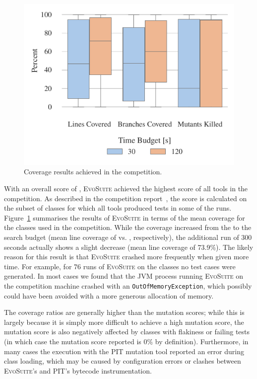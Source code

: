 \documentclass[10pt,conference]{IEEEtran}
\newcommand{\EVOSUITE}{\textsc{EvoSuite}\xspace}
\begin{document}
\begin{figure}
	\centering
	\includegraphics[width=\columnwidth]{data/CoverageBoxV}
	\vspace{-2em}
	\caption{\label{fig:results}Coverage results achieved in the competition.}
	\vspace{-1em}
\end{figure}


With an overall score of \score, \EVOSUITE achieved the highest score of all
tools in the competition. As described in the competition
report~\cite{SBST-toolcomp22}, the score is calculated on the subset of \cuts classes
for which all tools produced tests in some of the runs.
Figure~\ref{fig:results} summarises the results of \EVOSUITE in terms of the
mean coverage for the \cuts classes used in the competition. While the coverage
increased from the \budgetShort to the \budgetLong search budget (mean line
coverage of \avgLinesCoverageRatioShort vs. \avgLinesCoverageRatioLong, respectively),
the additional run of 300 seconds
actually shows a slight decrease (mean line coverage of 73.9\%). The likely
reason for this result is that \EVOSUITE crashed more frequently when given
more time. For example, for 76 runs of \EVOSUITE on the \cuts classes no test
cases were generated. In most cases we found that the JVM process running
\EVOSUITE on the competition machine crashed with an
\texttt{OutOfMemoryException}, which possibly could have been avoided with a
more generous allocation of memory.

The coverage ratios are generally higher than the mutation scores; while this is largely because it is simply more difficult to achieve a high mutation score, the mutation score is also negatively affected by classes with flakiness or failing tests (in which case the mutation score reported is 0\% by definition). Furthermore, in many cases the execution with the PIT mutation tool reported an error during class loading, which may be caused by configuration errors or clashes between \EVOSUITE's and PIT's bytecode instrumentation.
\end{document}
